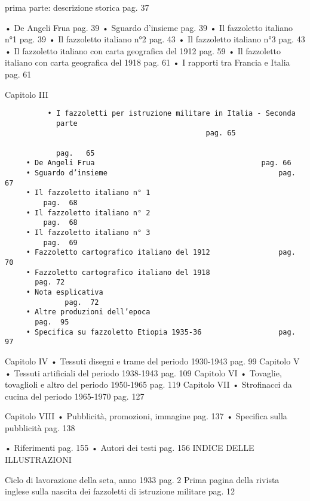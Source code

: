 prima parte: descrizione storica pag. 37

• De Angeli Frua pag. 39 • Sguardo d'insieme pag. 39 • Il fazzoletto
italiano n°1 pag. 39 • Il fazzoletto italiano n°2 pag. 43 • Il
fazzoletto italiano n°3 pag. 43 • Il fazzoletto italiano con carta
geografica del 1912 pag. 59 • Il fazzoletto italiano con carta
geografica del 1918 pag. 61 • I rapporti tra Francia e Italia pag. 61

Capitolo III

\begin{verbatim}
          • I fazzoletti per istruzione militare in Italia - Seconda
            parte
                                               pag. 65

            pag.   65
     • De Angeli Frua                                       pag. 66
     • Sguardo d’insieme                                        pag.  67
     • Il fazzoletto italiano n° 1
         pag.  68
     • Il fazzoletto italiano n° 2
         pag.  68
     • Il fazzoletto italiano n° 3
         pag.  69
     • Fazzoletto cartografico italiano del 1912                pag.  70
     • Fazzoletto cartografico italiano del 1918
       pag. 72
     • Nota esplicativa
              pag.  72
     • Altre produzioni dell’epoca
       pag.  95
     • Specifica su fazzoletto Etiopia 1935-36                  pag.  97
\end{verbatim}

Capitolo IV • Tessuti disegni e trame del periodo 1930-1943 pag. 99
Capitolo V • Tessuti artificiali del periodo 1938-1943 pag. 109 Capitolo
VI • Tovaglie, tovaglioli e altro del periodo 1950-1965 pag. 119
Capitolo VII • Strofinacci da cucina del periodo 1965-1970 pag. 127

Capitolo VIII • Pubblicità, promozioni, immagine pag. 137 • Specifica
sulla pubblicità pag. 138

• Riferimenti pag. 155 • Autori dei testi pag. 156 INDICE DELLE
ILLUSTRAZIONI

Ciclo di lavorazione della seta, anno 1933 pag. 2 Prima pagina della
rivista inglese sulla nascita dei fazzoletti di istruzione militare pag.
12

